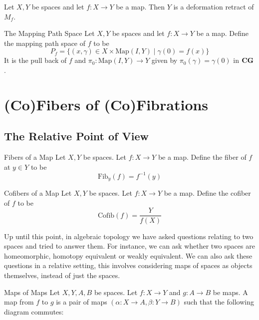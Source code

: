 \documentclass[a4paper]{article}
\begin{document}
\begin{lmm}{}{} Let $X,Y$ be spaces and let $f:X\to Y$ be a map. Then $Y$ is a deformation retract of $M_f$. 
\end{lmm}

\begin{defn}{The Mapping Path Space}{} Let $X,Y$ be spaces and let $f:X\to Y$ be a map. Define the mapping path space of $f$ to be $$P_f=\{(x,\gamma)\in X\times\text{Map}(I,Y)\;|\;\gamma(0)=f(x)\}$$ It is the pull back of $f$ and $\pi_0:\text{Map}(I,Y)\to Y$ given by $\pi_0(\gamma)=\gamma(0)$ in $\bold{CG}$. 
\end{defn}

\pagebreak
\section{(Co)Fibers of (Co)Fibrations}
\subsection{The Relative Point of View}
\begin{defn}{Fibers of a Map}{} Let $X,Y$ be spaces. Let $f:X\to Y$ be a map. Define the fiber of $f$ at $y\in Y$ to be $$\text{Fib}_y(f)=f^{-1}(y)$$
\end{defn}

\begin{defn}{Cofibers of a Map}{} Let $X,Y$ be spaces. Let $f:X\to Y$ be a map. Define the cofiber of $f$ to be $$\text{Cofib}(f)=\frac{Y}{f(X)}$$
\end{defn}

Up until this point, in algebraic topology we have asked questions relating to two spaces and tried to answer them. For instance, we can ask whether two spaces are homeomorphic, homotopy equivalent or weakly equivalent. We can also ask these questions in a relative setting, this involves considering maps of spaces as objects themselves, instead of just the spaces. 

\begin{defn}{Maps of Maps}{} Let $X,Y,A,B$ be spaces. Let $f:X\to Y$ and $g:A\to B$ be maps. A map from $f$ to $g$ is a pair of maps $(\alpha:X\to A,\beta:Y\to B)$ such that the following diagram commutes: \\~\\
\\~\\
\end{defn}
\end{document}
